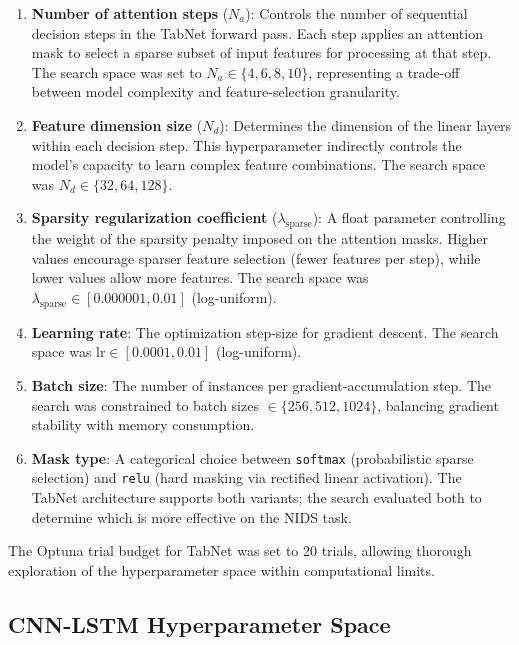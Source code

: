\documentclass[../main.tex]{subfiles}
\begin{document}
\begin{enumerate}
    \item \textbf{Number of attention steps} ($N_a$): Controls the number of sequential decision steps in the TabNet forward pass.  Each step applies an attention mask to select a sparse subset of input features for processing at that step.  The search space was set to $N_a \in \{4, 6, 8, 10\}$, representing a trade-off between model complexity and feature-selection granularity.

    \item \textbf{Feature dimension size} ($N_d$): Determines the dimension of the linear layers within each decision step.  This hyperparameter indirectly controls the model's capacity to learn complex feature combinations.  The search space was $N_d \in \{32, 64, 128\}$.

    \item \textbf{Sparsity regularization coefficient} ($\lambda_{\text{sparse}}$): A float parameter controlling the weight of the sparsity penalty imposed on the attention masks.  Higher values encourage sparser feature selection (fewer features per step), while lower values allow more features.  The search space was $\lambda_{\text{sparse}} \in [0.000001, 0.01]$ (log-uniform).

    \item \textbf{Learning rate}: The optimization step-size for gradient descent.  The search space was $\text{lr} \in [0.0001, 0.01]$ (log-uniform).

    \item \textbf{Batch size}: The number of instances per gradient-accumulation step.  The search was constrained to batch sizes $\in \{256, 512, 1024\}$, balancing gradient stability with memory consumption.

    \item \textbf{Mask type}: A categorical choice between \texttt{softmax} (probabilistic sparse selection) and \texttt{relu} (hard masking via rectified linear activation).  The TabNet architecture supports both variants; the search evaluated both to determine which is more effective on the NIDS task.
\end{enumerate}

The Optuna trial budget for TabNet was set to 20 trials, allowing thorough exploration of the hyperparameter space within computational limits.

\subsection{CNN-LSTM Hyperparameter Space}
\label{sec:hpo-cnnlstm}
\end{document}
